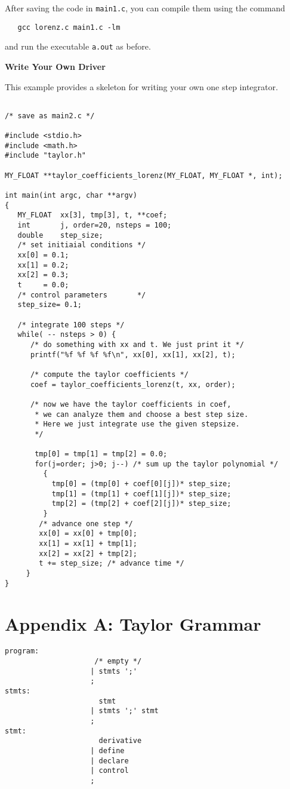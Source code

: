 \documentclass{article}
\begin{document}
{\noindent
After saving the code in \verb+main1.c+, you can compile
them using the command
\begin{verbatim}
   gcc lorenz.c main1.c -lm
\end{verbatim}
and run the executable \verb+a.out+ as before.


\vspace{3mm}
\noindent
{\bf Write Your Own Driver}

\vspace{2mm}
\noindent 
This example provides a skeleton for
writing your own one step integrator.

\begin{verbatim}

/* save as main2.c */

#include <stdio.h>
#include <math.h>
#include "taylor.h"

MY_FLOAT **taylor_coefficients_lorenz(MY_FLOAT, MY_FLOAT *, int);

int main(int argc, char **argv)
{
   MY_FLOAT  xx[3], tmp[3], t, **coef;
   int       j, order=20, nsteps = 100;
   double    step_size;
   /* set initiaial conditions */
   xx[0] = 0.1;
   xx[1] = 0.2;
   xx[2] = 0.3;
   t     = 0.0;
   /* control parameters       */
   step_size= 0.1;

   /* integrate 100 steps */
   while( -- nsteps > 0) {
      /* do something with xx and t. We just print it */
      printf("%f %f %f %f\n", xx[0], xx[1], xx[2], t);

      /* compute the taylor coefficients */
      coef = taylor_coefficients_lorenz(t, xx, order);

      /* now we have the taylor coefficients in coef,
       * we can analyze them and choose a best step size.
       * Here we just integrate use the given stepsize.
       */

       tmp[0] = tmp[1] = tmp[2] = 0.0;
       for(j=order; j>0; j--) /* sum up the taylor polynomial */
         { 
           tmp[0] = (tmp[0] + coef[0][j])* step_size;
           tmp[1] = (tmp[1] + coef[1][j])* step_size;
           tmp[2] = (tmp[2] + coef[2][j])* step_size;
         }
        /* advance one step */
        xx[0] = xx[0] + tmp[0];
        xx[1] = xx[1] + tmp[1];
        xx[2] = xx[2] + tmp[2];
        t += step_size; /* advance time */
     }
}
\end{verbatim}

\section{Appendix A: Taylor Grammar}
{\scriptsize
\begin{verbatim}
program:
                     /* empty */
                    | stmts ';'
                    ;
stmts: 
                      stmt
                    | stmts ';' stmt
                    ;  
stmt:
                      derivative
                    | define
                    | declare
                    | control
                    ;


\end{verbatim}}}
\end{document}
